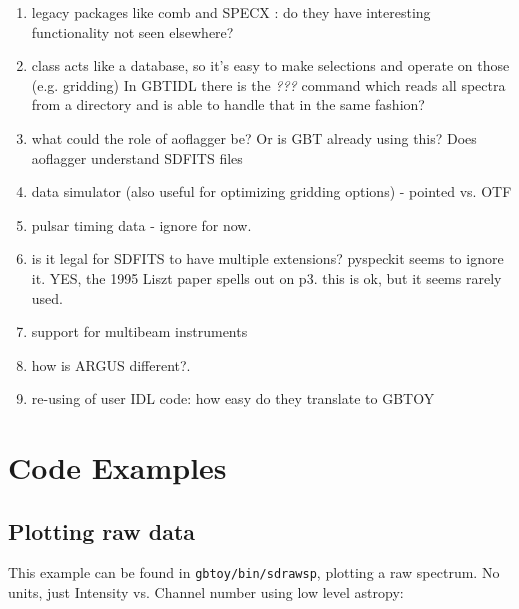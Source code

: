 \documentclass[12pt,a4paper]{article}
\begin{document}
\begin{enumerate}

\item legacy packages like comb and SPECX : do they have interesting functionality not seen elsewhere?

\item class acts like a database, so it's easy to make selections and operate on those (e.g. gridding)
  In GBTIDL there is the {\it ???} command which reads all spectra from a directory and is able
  to handle that in the same fashion?

\item   what could the role of aoflagger \cite{offringa-2012-morph-rfi-algorithm} be? Or is GBT already
  using this? Does aoflagger understand SDFITS files

\item  data simulator (also useful for optimizing gridding options) - pointed vs. OTF

\item pulsar timing data - ignore for now.

\item is it legal for SDFITS to have multiple extensions?  pyspeckit seems to ignore it.
  YES, the 1995 Liszt paper spells out on p3. this is ok, but it seems rarely used.

\item support for multibeam instruments

\item how is ARGUS different?.

\item re-using of user IDL code: how easy do they translate to GBTOY  
  
  
\end{enumerate}

\section{Code Examples}

\subsection{Plotting raw data}

This example can be found in {\tt gbtoy/bin/sdrawsp}, plotting a raw spectrum. No units, just
Intensity vs. Channel number using low level astropy:
\end{document}
